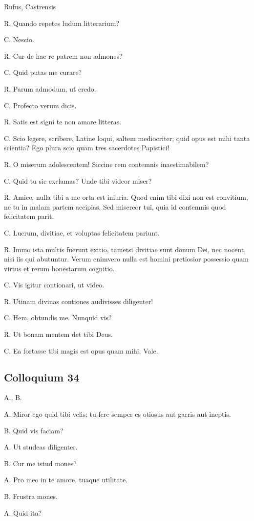 \documentclass{article}
\begin{document}
Rufus, Castrensis

R. Quando repetes ludum litterarium?

C. Nescio. 

R. Cur de hac re patrem non admones?

C. Quid putas me curare?

R. Parum admodum, ut credo. 

C. Profecto verum dicis. 

R. Satis est signi te non amare litteras. 

C. Scio legere, scribere, Latine loqui, saltem mediocriter; quid opus est mihi tanta scientia? Ego plura scio quam tres sacerdotes Papistici!

R. O miserum adolescentem! Siccine rem contemnis inaestimabilem?

C. Quid tu sic exclamas? Unde tibi videor miser?

R. Amice, nulla tibi a me orta est iniuria. Quod enim tibi dixi non est convitium, ne tu in malam partem accipias. Sed misereor tui, quia id contemnis quod felicitatem parit. 

C. Lucrum, divitiae, et voluptas felicitatem pariunt. 

R. Immo ista multis fuerunt exitio, tametsi divitiae sunt donum Dei, nec nocent, nisi iis qui abutuntur. Verum enimvero nulla est homini pretiosior possessio quam virtus et rerum honestarum cognitio. 

C. Vis igitur contionari, ut video. 

R. Utinam divinas contiones audivisses diligenter!

C. Hem, obtundis me. Nunquid vis?

R. Ut bonam mentem det tibi Deus. 

C. Ea fortasse tibi magis est opus quam mihi. Vale.

\subsection{Colloquium 34}
A., B.

A. Miror ego quid tibi velis; tu fere semper es otiosus aut garris aut ineptis. 

B. Quid vis faciam?

A. Ut studeas diligenter. 

B. Cur me istud mones?

A. Pro meo in te amore, tuaque utilitate. 

B. Frustra mones. 

A. Quid ita?
\end{document}
